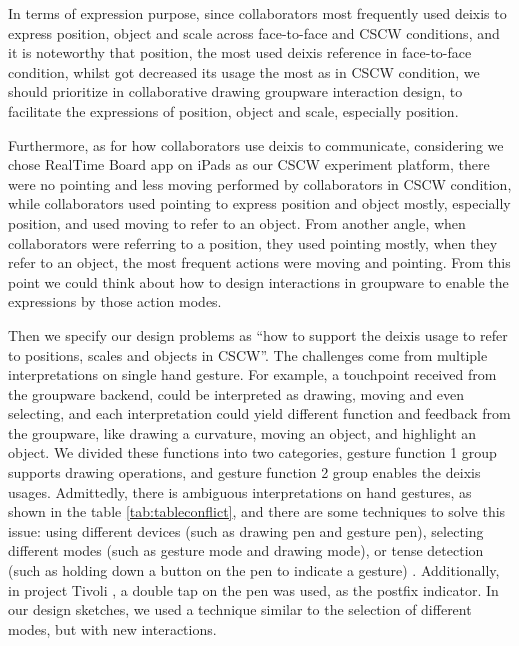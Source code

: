 \documentclass[12pt,twoside]{article}
\begin{document}
In terms of expression purpose, since collaborators most frequently used deixis to express position, object and scale across face-to-face and CSCW conditions, and it is noteworthy that position, the most used deixis reference in face-to-face condition, whilst got decreased its usage the most as in CSCW condition, we should prioritize in collaborative drawing groupware interaction design, to facilitate the expressions of position, object and scale, especially position.

Furthermore, as for how collaborators use deixis to communicate, considering we chose RealTime Board app on iPads as our CSCW experiment platform, there were no pointing and less moving performed by collaborators in CSCW condition, while collaborators used pointing to express position and object mostly, especially position, and used moving to refer to an object. From another angle, when collaborators were referring to a position, they used pointing mostly, when they refer to an object, the most frequent actions were moving and pointing. From this point we could think about how to design interactions in groupware to enable the expressions by those action modes.

Then we specify our design problems as ``how to support the deixis usage to refer to positions, scales and objects in CSCW”. The challenges come from multiple interpretations on single hand gesture. For example, a touchpoint received from the groupware backend, could be interpreted as drawing, moving and even selecting, and each interpretation could yield different function and feedback from the groupware, like drawing a curvature, moving an object, and highlight an object. We divided these functions into two categories, gesture function 1 group supports drawing operations, and gesture function 2 group enables the deixis usages. Admittedly, there is ambiguous interpretations on hand gestures, as shown in the table \ref{tab:tableconflict}, and there are some techniques to solve this issue: using different devices (such as drawing pen and gesture pen), selecting different modes (such as gesture mode and drawing mode), or tense detection (such as holding down a button on the pen to indicate a gesture) \cite{buxton1986chunking}. Additionally, in project Tivoli \cite{pedersen1993tivoli}, a double tap on the pen was used, as the postfix indicator. In our design sketches, we used a technique similar to the selection of different modes, but with new interactions.
\end{document}
